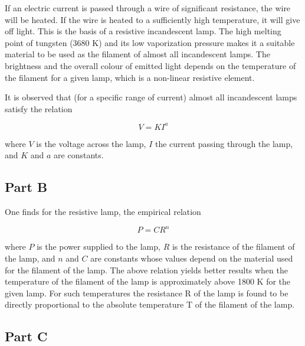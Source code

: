 If an electric current is passed through a wire of significant resistance, the wire will be heated. If the wire is heated to a sufficiently high temperature, it will give off light.  This is the basis of a resistive incandescent lamp. The high melting point of tungsten (3680 K) and its low vaporization pressure makes it a suitable material to be used as the filament of almost all incandescent lamps. The brightness and the overall colour of emitted light depends on the temperature of the filament for a given lamp, which is a non-linear resistive element.

It is observed that (for a specific range of current) almost all incandescent lamps satisfy the relation

\begin{equation*}
V = K I^a
\end{equation*}

where $V$ is the voltage across the lamp, $I$ the current passing through the lamp, and $K$ and $a$ are constants.

\subsection*{Part B}


One finds for the resistive lamp, the empirical relation

\begin{equation*}
P = C R^n
\end{equation*}

where $P$ is the power supplied to the lamp, $R$ is the resistance of the filament of the lamp, and $n$ and $C$ are constants whose values depend on the material used for the filament of the lamp. The above relation yields better results when the temperature of the filament of the lamp is approximately above 1800 K for the given lamp. For such temperatures the resistance R of the lamp is found to be directly proportional to the absolute temperature T of the filament of the lamp.



\subsection*{Part C}


